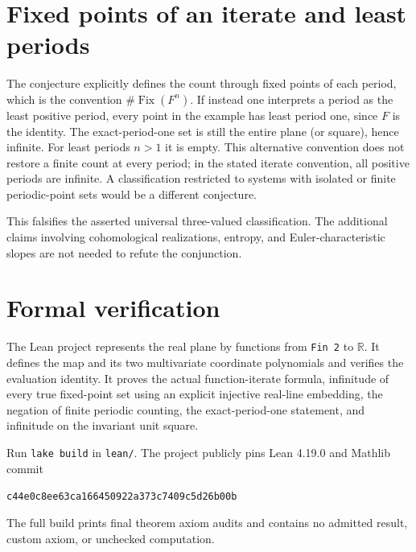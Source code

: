 \documentclass[11pt]{article}
\begin{document}
\section*{Fixed points of an iterate and least periods}
The conjecture explicitly defines the count through fixed points of each period, which is the convention $\#\operatorname{Fix}(F^n)$. If instead one interprets a period as the least positive period, every point in the example has least period one, since $F$ is the identity. The exact-period-one set is still the entire plane (or square), hence infinite. For least periods $n>1$ it is empty. This alternative convention does not restore a finite count at every period; in the stated iterate convention, all positive periods are infinite. A classification restricted to systems with isolated or finite periodic-point sets would be a different conjecture.

This falsifies the asserted universal three-valued classification. The additional claims involving cohomological realizations, entropy, and Euler-characteristic slopes are not needed to refute the conjunction.

\section*{Formal verification}
The Lean project represents the real plane by functions from \texttt{Fin 2} to $\mathbb R$. It defines the map and its two multivariate coordinate polynomials and verifies the evaluation identity. It proves the actual function-iterate formula, infinitude of every true fixed-point set using an explicit injective real-line embedding, the negation of finite periodic counting, the exact-period-one statement, and infinitude on the invariant unit square.

Run \texttt{lake build} in \texttt{lean/}. The project publicly pins Lean 4.19.0 and Mathlib commit
\begin{center}\small\texttt{c44e0c8ee63ca166450922a373c7409c5d26b00b}\end{center}
The full build prints final theorem axiom audits and contains no admitted result, custom axiom, or unchecked computation.
\end{document}

